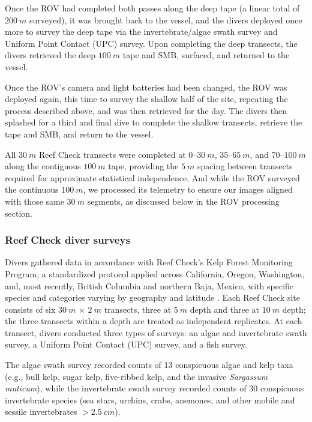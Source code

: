 \documentclass[11pt]{article}
\begin{document}
Once the ROV had completed both passes along the deep tape (a linear total of 
$200~m$ surveyed), it was brought back to the vessel, and the divers deployed 
once more to survey the deep tape via the invertebrate/algae swath survey and 
Uniform Point Contact (UPC) survey.
Upon completing the deep transects, the divers retrieved the deep $100~m$ tape 
and SMB, surfaced, and returned to the vessel.

Once the ROV's camera and light batteries had been changed, the ROV was
deployed again, this time to survey the shallow half of the site, repeating
the process described above, and was then retrieved for the day.
The divers then splashed for a third and final dive to complete the shallow
transects, retrieve the tape and SMB, and return to the vessel.

All $30~m$ Reef Check transects were completed at
$0$--$30~m$, $35$--$65~m$, and $70$--$100~m$ along the contiguous $100~m$ tape,
providing the $5~m$ spacing between transects required for approximate
statistical independence.
And while the ROV surveyed the continuous $100~m$, we processed its telemetry 
to ensure our images aligned with those same $30~m$ segments, as discussed 
below in the ROV processing section.

\subsubsection{Reef Check diver surveys}
\label{subsubsec:diver_surveys}

Divers gathered data in accordance with Reef Check's Kelp Forest Monitoring 
Program, a standardized protocol applied across California, Oregon, Washington, 
and, most recently, British Columbia and northern Baja, Mexico, with specific 
species and categories varying by geography and latitude \citep{Freiwald2021, 
Freiwald:2023aa}.
Each Reef Check site consists of six $30~m$ $\times$ $2~m$ transects, three at 
$5~m$ depth and three at $10~m$ depth; 
the three transects within a depth are treated as independent replicates.
At each transect, divers conducted three types of surveys: an algae and invertebrate swath survey, a Uniform Point Contact (UPC) survey, and a fish survey.

The algae swath survey recorded counts of 13 conspicuous algae and kelp taxa 
(e.g., bull kelp, sugar kelp, five-ribbed kelp, and the invasive 
\textit{Sargassum muticum}), while the invertebrate swath survey recorded 
counts of 30 conspicuous invertebrate species (sea stars, urchins, crabs,
anemones, and other mobile and sessile invertebrates $>2.5~cm$).
\end{document}
